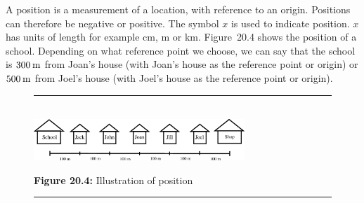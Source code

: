         \label{m38787*id62737}A position is a measurement of a location, with reference to an origin. Positions can therefore be negative or positive. The symbol \begin{math}x\end{math} is used to indicate position. \begin{math}x\end{math} has units of length for example cm, m or km.
Figure~20.4 shows the position of a school. Depending on what reference point we choose, we can say that the school is \begin{math}300\phantom{\rule{2pt}{0ex}}\mathrm{m}\end{math} from Joan's house (with Joan's house as the reference point or origin) or  \begin{math}500\phantom{\rule{2pt}{0ex}}\mathrm{m}\end{math} from Joel's house (with Joel's house as the reference point or origin).\par 
        
    \setcounter{subfigure}{0}


	\begin{figure}[H] %
    \begin{center}
    \rule[.1in]{\figurerulewidth}{.005in} \\
        \label{m38787*uid7!!!underscore!!!media}\label{m38787*uid7!!!underscore!!!printimage}\includegraphics[width=300px]{col11305.imgs/m38787_PG10C2_003.png} %
        
      \vspace{2pt}
    \vspace{\rubberspace}\par \begin{cnxcaption}
	  \small \textbf{Figure 20.4: }Illustration of position
	\end{cnxcaption}
      
    \vspace{.1in}
    \rule[.1in]{\figurerulewidth}{.005in} \\
        
    \end{center}

 \end{figure}   

